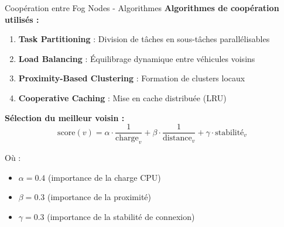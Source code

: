 ﻿\documentclass[aspectratio=169,11pt]{beamer}
\begin{document}
\begin{frame}{Coop\'eration entre Fog Nodes - Algorithmes}
\textbf{Algorithmes de coop\'eration utilis\'es :}

\begin{enumerate}
    \item \textbf{Task Partitioning} : Division de t\^aches en sous-t\^aches parall\'elisables
    \item \textbf{Load Balancing} : \'Equilibrage dynamique entre v\'ehicules voisins
    \item \textbf{Proximity-Based Clustering} : Formation de clusters locaux
    \item \textbf{Cooperative Caching} : Mise en cache distribu\'ee (LRU)
\end{enumerate}

\vspace{0.3cm}
\textbf{S\'election du meilleur voisin :}
\begin{equation}
\text{score}(v) = \alpha \cdot \frac{1}{\text{charge}_{v}} + \beta \cdot \frac{1}{\text{distance}_{v}} + \gamma \cdot \text{stabilit\'e}_{v}
\end{equation}

O\`u :
\begin{itemize}
    \item $\alpha = 0.4$ (importance de la charge CPU)
    \item $\beta = 0.3$ (importance de la proximit\'e)
    \item $\gamma = 0.3$ (importance de la stabilit\'e de connexion)
\end{itemize}
\end{frame}
\end{document}
